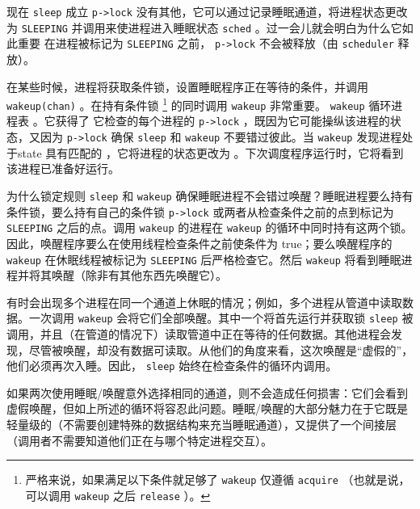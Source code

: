 \documentclass[UTF8]{article}
\begin{document}
现在
    \lstinline{sleep}    成立
    \lstinline{p->lock}    没有其他，它可以通过记录睡眠通道，将进程状态更改为    \texttt{SLEEPING}    并调用来使进程进入睡眠状态
    \lstinline{sched}   
        。过一会儿就会明白为什么它如此重要
 在进程被标记为    \texttt{SLEEPING}    之前，   \lstinline{p->lock}    不会被释放（由    \lstinline{scheduler}    释放）。  

在某些时候，进程将获取条件锁，设置睡眠程序正在等待的条件，并调用    \lstinline{wakeup(chan)}    。在持有条件锁    \footnote{严格来说，如果满足以下条件就足够了
    \lstinline{wakeup}    仅遵循
    \lstinline{acquire}   （也就是说，可以调用
    \lstinline{wakeup}    之后
    \lstinline{release}   ）。  }    的同时调用    \lstinline{wakeup}    非常重要。
    \lstinline{wakeup}    循环进程表
        。它获得了
 它检查的每个进程的    \lstinline{p->lock}    ，既因为它可能操纵该进程的状态，又因为
    \lstinline{p->lock}    确保
    \lstinline{sleep}    和
    \lstinline{wakeup}   不要错过彼此。当   \lstinline{wakeup}   发现进程处于state
        具有匹配的
        ，它将进程的状态更改为
        。下次调度程序运行时，它将看到该进程已准备好运行。  

为什么锁定规则
    \lstinline{sleep}    和
    \lstinline{wakeup}    确保睡眠进程不会错过唤醒？睡眠进程要么持有条件锁，要么持有自己的条件锁
    \lstinline{p->lock}    或两者从检查条件之前的点到标记为    \texttt{SLEEPING}    之后的点。调用    \texttt{wakeup}    的进程在    \texttt{wakeup}    的循环中同时持有这两个锁。因此，唤醒程序要么在使用线程检查条件之前使条件为 true；要么唤醒程序的    \lstinline{wakeup}    在休眠线程被标记为    \texttt{SLEEPING}    后严格检查它。然后
    \lstinline{wakeup}    将看到睡眠进程并将其唤醒（除非有其他东西先唤醒它）。  

有时会出现多个进程在同一个通道上休眠的情况；例如，多个进程从管道中读取数据。一次调用
    \lstinline{wakeup}    会将它们全部唤醒。其中一个将首先运行并获取锁
    \lstinline{sleep}    被调用，并且（在管道的情况下）读取管道中正在等待的任何数据。其他进程会发现，尽管被唤醒，却没有数据可读取。从他们的角度来看，这次唤醒是“虚假的”，他们必须再次入睡。因此，   \lstinline{sleep}    始终在检查条件的循环内调用。  

如果两次使用睡眠/唤醒意外选择相同的通道，则不会造成任何损害：它们会看到虚假唤醒，但如上所述的循环将容忍此问题。睡眠/唤醒的大部分魅力在于它既是轻量级的（不需要创建特殊的数据结构来充当睡眠通道），又提供了一个间接层（调用者不需要知道他们正在与哪个特定进程交互）。
\end{document}
